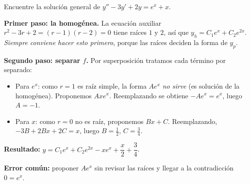 \begin{example}
    Encuentre la soluci\'on general de $y''-3y'+2y=e^x+x$.

    \textbf{Primer paso: la homog\'enea.} La ecuaci\'on auxiliar $r^2-3r+2=(r-1)(r-2)=0$ tiene ra\'ices $1$ y $2$, as\'i que $y_h=C_1e^x+C_2e^{2x}$. \emph{Siempre conviene hacer esto primero}, porque las ra\'ices deciden la forma de $y_p$.

    \textbf{Segundo paso: separar $f$.} Por superposici\'on tratamos cada t\'ermino por separado:
    \begin{itemize}
        \item Para $e^x$: como $r=1$ es ra\'iz simple, la forma $Ae^x$ \emph{no sirve} (es soluci\'on de la homog\'enea). Proponemos $Axe^x$. Reemplazando se obtiene $-Ae^x=e^x$, luego $A=-1$.
        \item Para $x$: como $r=0$ no es ra\'iz, proponemos $Bx+C$. Reemplazando, $-3B+2Bx+2C=x$, luego $B=\frac12$, $C=\frac34$.
    \end{itemize}

    \textbf{Resultado:} $y=C_1e^x+C_2e^{2x}-xe^x+\dfrac{x}{2}+\dfrac{3}{4}$.

    \textbf{Error com\'un:} proponer $Ae^x$ sin revisar las ra\'ices y llegar a la contradicci\'on $0=e^x$.
\end{example}

